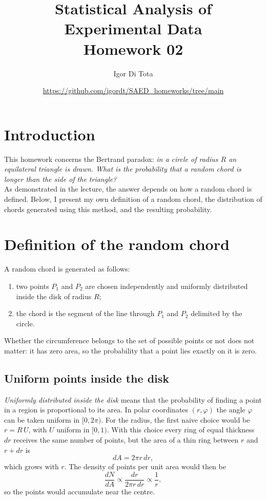 \documentclass[11pt,a4paper]{article}
\title{Statistical Analysis of Experimental Data\\
	\vspace{0.2cm}
	\large{Homework 02}}
\author{Igor Di Tota}
\date{\small \url{https://github.com/igordt/SAED_homeworks/tree/main}}
\begin{document}
	\maketitle
	
	\section*{Introduction}
	
	This homework concerns the Bertrand paradox: \textit{in a circle of radius $R$ an equilateral triangle is drawn.
	What is the probability that a random chord is longer than the side of the triangle?}\\
	
	As demonstrated in the lecture, the answer depends on how a random chord is defined.
	Below, I present my own definition of a random chord, the distribution of chords generated using this method, and the resulting probability.
	
	\section*{Definition of the random chord}
	
	A random chord is generated as follows:
	\begin{enumerate}
		\item two points $P_1$ and $P_2$ are chosen independently and uniformly distributed inside the disk of radius $R$;
		\item the chord is the segment of the line through $P_1$ and $P_2$ delimited by the circle.
	\end{enumerate}
	Whether the circumference belongs to the set of possible points or not does not matter: it has zero area, so the probability that a point lies exactly on it is zero.
	
	\subsection*{Uniform points inside the disk}
	
	\emph{Uniformly distributed inside the disk} means that the probability of finding a point in a region is proportional to its area.
	In polar coordinates $(r, \varphi)$ the angle $\varphi$ can be taken uniform in $[0, 2\pi)$.
	For the radius, the first naive choice would be $r = R\,U$, with $U$ uniform in $[0, 1)$.
	With this choice every ring of equal thickness $dr$ receives the same number of points, but the area of a thin ring between $r$ and $r + dr$ is
	\begin{equation}
		dA = 2\pi r\, dr,
	\end{equation}
	which grows with $r$. The density of points per unit area would then be
	\begin{equation}
		\frac{dN}{dA} \propto \frac{dr}{2\pi r\, dr} \propto \frac{1}{r},
	\end{equation}
	so the points would accumulate near the centre.
	
\end{document}
